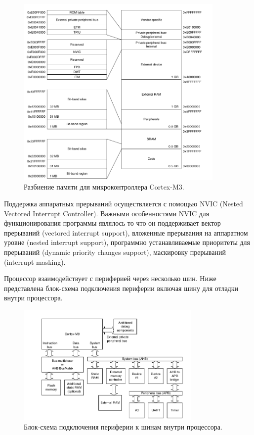 \begin{figure}[h!]
    \centering
    \includegraphics[width=0.9\textwidth]{predefined_memory_map.png}
    \caption{Разбиение памяти для микроконтроллера Cortex-M3.}
\end{figure}


Поддержка аппаратных прерываний осуществляется с помощью NVIC (Nested Vectored Interrupt Controller). Важными особенностями NVIC для функционирования программы являлось то что он поддерживает вектор прерываний (vectored interrupt support), вложенные прерывания на аппаратном уровне (nested interrupt support), программно устанавливаемые приоритеты для прерываний (dynamic priority changes support), маскировку прерываний (interrupt masking).


Процессор взаимодействует с периферией через несколько шин. Ниже представлена блок-схема подключения периферии включая шину для отладки внутри процессора.

\begin{figure}[h!]
    \centering
    \includegraphics[width=0.8\textwidth]{cortex_m3_peripherals_block_diagram.png}
    \caption{Блок-схема подключения периферии к шинам внутри процессора.}
\end{figure}


